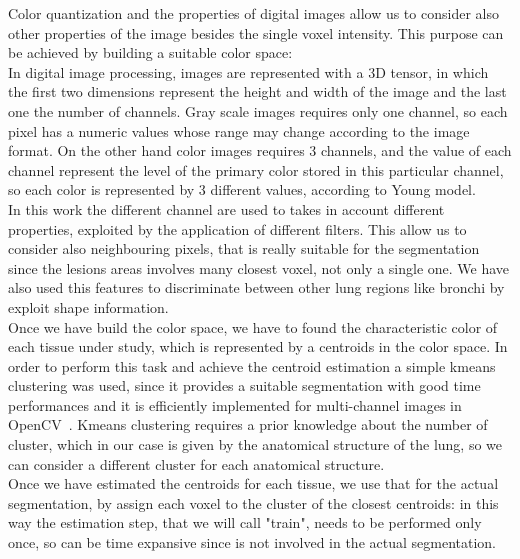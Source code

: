 \documentclass{standalone}
\begin{document}
	Color quantization and the properties of digital images allow us to consider also other properties of the image besides the single voxel intensity.
	This purpose can be achieved by building a suitable color space: \\
	In digital image processing, images are represented with a 3D tensor, in which the first two dimensions represent the height and width of the image 
	and the last one the number of channels. Gray scale images requires only one channel, so each pixel has a numeric values whose range may change 
	according to the image format. On the other hand color images requires 3 channels, and the value of each channel represent the level of the primary 
	color stored in this particular channel, so each color is represented by 3 different values, according to Young model. \\
	In this work the different channel are used to takes in account different properties, exploited by the application of different filters. This allow us to consider also neighbouring pixels, that is really suitable for the segmentation since the  lesions areas involves many closest voxel, not only a single one. We have also used this features to discriminate between other lung regions like bronchi by exploit shape information.\\
	
	Once we have build the color space, we have to found the characteristic color of each tissue under study, which is represented by a centroids in the color space. In order to perform this task and achieve the centroid estimation a simple kmeans clustering was used, since it provides a suitable segmentation with good time performances and it is efficiently implemented for multi-channel images in OpenCV~\cite{OpenCV}. 
	Kmeans clustering requires a prior knowledge about the number of cluster, which in our case is given by the anatomical structure of the lung, so we can consider a different cluster for each anatomical structure.\\
	Once we have estimated the centroids for each tissue, we use that for the actual segmentation, by assign each voxel to the cluster of the closest centroids: in this way the estimation step, that we will call "train", needs to be performed only once, so can be time expansive since is not involved in the actual segmentation.\\


	
	
	
	

	
	
\end{document}

